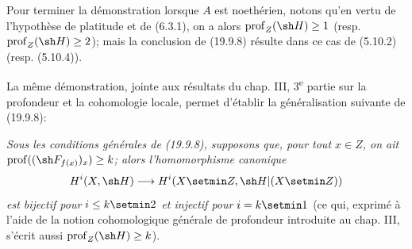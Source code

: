 Pour terminer la démonstration lorsque $A$ est noethérien, notons qu'en vertu de l'hypothèse de platitude et de (6.3.1), on a alors $\operatorname{prof}_Z(\sh H)\geq1$ (resp. $\operatorname{prof}_Z(\sh H)\geq2$); mais la conclusion de (19.9.8) résulte dans ce cas de (5.10.2) (resp. (5.10.4)).

\begin{remark}[19.9.9]
\label{IV.19.9.9}
La même démonstration, jointe aux résultats du chap. III, 3\textsuperscript{e} partie sur la profondeur et la cohomologie locale, permet d'établir la généralisation suivante de (19.9.8):

\emph{Sous les conditions générales de \textup{(19.9.8)}, supposons que, pour tout $x\in Z$, on ait $\operatorname{prof}((\sh F_{f(x)})_x)\geq k$; alors l'homomorphisme canonique}
\[
  H^i(X,\sh H)\longrightarrow H^i(X\setmin Z,\sh H|(X\setmin Z))
\]
\emph{est bijectif pour $i\leq k\setmin 2$ et injectif pour $i=k\setmin 1$} (ce qui, exprimé à l'aide de la notion cohomologique générale de profondeur introduite au chap. III, s'écrit aussi $\operatorname{prof}_Z(\sh H)\geq k$).
\end{remark}
